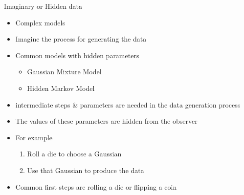 \documentclass[aspectratio=169]{beamer}
\begin{document}
\begin{frame}{Imaginary or Hidden data}

\begin{itemize}
\item Complex models
\item Imagine the process for generating the data
\item Common models with hidden parameters
	\begin{itemize}
	\item Gaussian Mixture Model
	\item Hidden Markov Model
	\end{itemize}	
\item intermediate steps \& parameters are needed in the data generation process
\item The values of these parameters are hidden from the observer
\item For example
	\begin{enumerate}
	\item Roll a die to choose a Gaussian
	\item Use that Gaussian to produce the data
	\end{enumerate}	
\item Common first steps are rolling a die or flipping a coin
\end{itemize}
\end{frame}
\end{document}
